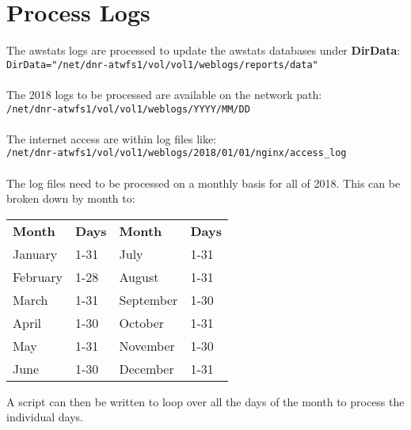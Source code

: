 
\newpage
\section{Process Logs}
The awstats logs are processed to update the awstats databases
under \textbf{DirData}:\\
\indent\texttt{DirData="/net/dnr-atwfs1/vol/vol1/weblogs/reports/data"}\\
\\
The 2018 logs to be processed are available on the network path:\\
\indent\texttt{/net/dnr-atwfs1/vol/vol1/weblogs/YYYY/MM/DD}\\
\\
The internet access are within log files like:\\
\indent\texttt{/net/dnr-atwfs1/vol/vol1/weblogs/2018/01/01/nginx/access\_log}\\
\\
The log files need to be processed on a monthly basis for all of
2018. This can be broken down by month to:
\\
\begin{center}
\begin{tabular}{l@{\hskip0.5in}l@{\hskip1.5in}l@{\hskip0.5in}l}
\bf{Month} & \bf{Days} & \bf{Month} & \bf{Days} \\
January    & 1-31      & July       & 1-31 \\
February   & 1-28      & August     & 1-31 \\
March      & 1-31      & September  & 1-30 \\
April      & 1-30      & October    & 1-31 \\
May        & 1-31      & November   & 1-30 \\
June       & 1-30      & December   & 1-31 \\
\end{tabular}
\end{center}

\noindent A script can then be written to loop over all the days 
of the month to process the individual days.
